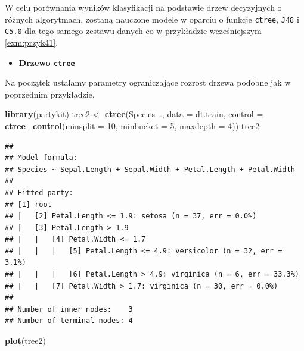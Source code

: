 \documentclass[]{book}
\newenvironment{Shaded}{\begin{snugshade}}{\end{snugshade}}
\newcommand{\DataTypeTok}[1]{\textcolor[rgb]{0.13,0.29,0.53}{#1}}
\newcommand{\DecValTok}[1]{\textcolor[rgb]{0.00,0.00,0.81}{#1}}
\newcommand{\KeywordTok}[1]{\textcolor[rgb]{0.13,0.29,0.53}{\textbf{#1}}}
\newcommand{\NormalTok}[1]{#1}
\newcommand{\OperatorTok}[1]{\textcolor[rgb]{0.81,0.36,0.00}{\textbf{#1}}}
\newcommand{\StringTok}[1]{\textcolor[rgb]{0.31,0.60,0.02}{#1}}
\providecommand{\tightlist}{%
  \setlength{\itemsep}{0pt}\setlength{\parskip}{0pt}}
\theoremstyle{plain}
\theoremstyle{definition}
\theoremstyle{definition}
\theoremstyle{definition}
\theoremstyle{definition}
\theoremstyle{remark}
\let\BeginKnitrBlock\begin \let\EndKnitrBlock\end
\begin{document}
\BeginKnitrBlock{example}
\protect\hypertarget{exm:przyk42}{}{\label{exm:przyk42} }W celu porównania wyników klasyfikacji na podstawie drzew decyzyjnych o różnych algorytmach, zostaną nauczone modele w oparciu o funkcje \texttt{ctree}, \texttt{J48} i \texttt{C5.0} dla tego samego zestawu danych co w przykładzie wcześniejszym \ref{exm:przyk41}.
\EndKnitrBlock{example}

\begin{itemize}
\tightlist
\item
  \textbf{Drzewo \texttt{ctree}}
\end{itemize}

Na początek ustalamy parametry ograniczające rozrost drzewa podobne jak w poprzednim przykładzie.

\begin{Shaded}
\begin{Highlighting}[]
\KeywordTok{library}\NormalTok{(partykit)}
\NormalTok{tree2 <-}\StringTok{ }\KeywordTok{ctree}\NormalTok{(Species}\OperatorTok{~}\NormalTok{., }\DataTypeTok{data =}\NormalTok{ dt.train,}
               \DataTypeTok{control =} \KeywordTok{ctree_control}\NormalTok{(}\DataTypeTok{minsplit =} \DecValTok{10}\NormalTok{,}
                                       \DataTypeTok{minbucket =} \DecValTok{5}\NormalTok{,}
                                       \DataTypeTok{maxdepth =} \DecValTok{4}\NormalTok{))}
\NormalTok{tree2}
\end{Highlighting}
\end{Shaded}

\begin{verbatim}
## 
## Model formula:
## Species ~ Sepal.Length + Sepal.Width + Petal.Length + Petal.Width
## 
## Fitted party:
## [1] root
## |   [2] Petal.Length <= 1.9: setosa (n = 37, err = 0.0%)
## |   [3] Petal.Length > 1.9
## |   |   [4] Petal.Width <= 1.7
## |   |   |   [5] Petal.Length <= 4.9: versicolor (n = 32, err = 3.1%)
## |   |   |   [6] Petal.Length > 4.9: virginica (n = 6, err = 33.3%)
## |   |   [7] Petal.Width > 1.7: virginica (n = 30, err = 0.0%)
## 
## Number of inner nodes:    3
## Number of terminal nodes: 4
\end{verbatim}

\begin{Shaded}
\begin{Highlighting}[]
\KeywordTok{plot}\NormalTok{(tree2)}
\end{Highlighting}
\end{Shaded}
\end{document}
